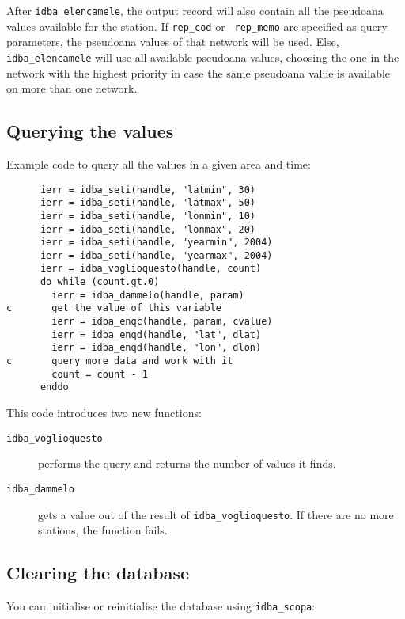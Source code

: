 \documentclass[final,12pt,a4paper,twoside]{book}
\begin{document}
After {\tt idba\_elencamele}, the output record will also contain all the
pseudoana values available for the station.  If {\tt rep\_cod} or {\tt
rep\_memo} are specified as query parameters, the pseudoana values of that
network will be used.  Else, {\tt idba\_elencamele} will use all available
pseudoana values, choosing the one in the network with the highest priority in
case the same pseudoana value is available on more than one network.


\subsection {Querying the values}

Example code to query all the values in a given area and time:
\label{fun-idba_voglioquesto}
\label{fun-idba_dammelo}

\begin{verbatim}
      ierr = idba_seti(handle, "latmin", 30)
      ierr = idba_seti(handle, "latmax", 50)
      ierr = idba_seti(handle, "lonmin", 10)
      ierr = idba_seti(handle, "lonmax", 20)
      ierr = idba_seti(handle, "yearmin", 2004)
      ierr = idba_seti(handle, "yearmax", 2004)
      ierr = idba_voglioquesto(handle, count)
      do while (count.gt.0)
        ierr = idba_dammelo(handle, param)
c       get the value of this variable
        ierr = idba_enqc(handle, param, cvalue)
        ierr = idba_enqd(handle, "lat", dlat)
        ierr = idba_enqd(handle, "lon", dlon)
c       query more data and work with it
        count = count - 1
      enddo
\end{verbatim}
   
This code introduces two new functions:

\begin{description}
\item[{\tt idba\_voglioquesto}]
  performs the query and returns the number of values it finds.
\item[{\tt idba\_dammelo}]
  gets a value out of the result of {\tt idba\_voglioquesto}.  If there are no
  more stations, the function fails.
\end{description}

\subsection {Clearing the database}

You can initialise or reinitialise the database using {\tt idba\_scopa}:
\label{fun-idba_scopa}
\end{document}
